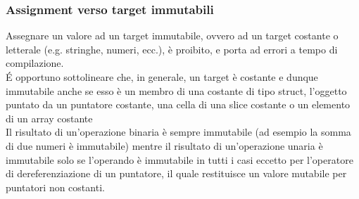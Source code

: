 \subsubsection{Assignment verso target immutabili}
Assegnare un valore ad un target immutabile, ovvero ad un target costante o letterale 
(e.g. stringhe, numeri, ecc.), è proibito, e porta ad errori a tempo di compilazione. \\

É opportuno sottolineare che, in generale, un target è costante e dunque immutabile anche se esso
è un membro di una costante di tipo struct, l'oggetto puntato da un puntatore costante, una cella 
di una slice costante o un elemento di un array costante \\

Il risultato di un'operazione binaria è sempre immutabile (ad esempio la somma di due numeri è immutabile)
mentre il risultato di un'operazione unaria è immutabile solo se l'operando è immutabile in tutti i casi
eccetto per l'operatore di dereferenziazione di un puntatore, il quale restituisce un valore mutabile per 
puntatori non costanti. \\